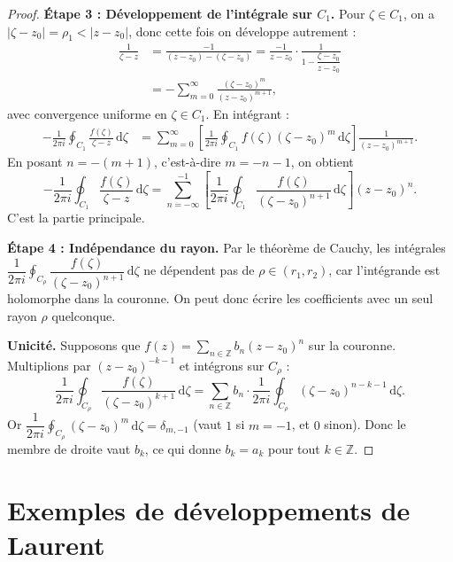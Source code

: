 \documentclass[12pt,a4paper,openany]{book}
\theoremstyle{definition}
\theoremstyle{plain}
\theoremstyle{remark}
\newcommand{\Z}{\mathbb{Z}}
\newcommand{\dd}{\mathrm{d}}
\newcommand{\abs}[1]{\left|#1\right|}
\begin{document}
\begin{proof}
\medskip
\noindent\textbf{Étape 3 : Développement de l'intégrale sur $C_1$.}
Pour $\zeta \in C_1$, on a $\abs{\zeta - z_0} = \rho_1 < \abs{z - z_0}$,
donc cette fois on développe autrement :
\begin{align*}
  \frac{1}{\zeta - z}
  &= \frac{-1}{(z - z_0) - (\zeta - z_0)}
  = \frac{-1}{z - z_0}\cdot\frac{1}{1 - \dfrac{\zeta - z_0}{z - z_0}} \\
  &= -\sum_{m=0}^{\infty}\frac{(\zeta - z_0)^m}{(z - z_0)^{m+1}},
\end{align*}
avec convergence uniforme en $\zeta \in C_1$. En intégrant :
\begin{align*}
  -\frac{1}{2\pi i}\oint_{C_1}\frac{f(\zeta)}{\zeta - z}\,\dd\zeta
  &= \sum_{m=0}^{\infty}\left[\frac{1}{2\pi i}\oint_{C_1}
  f(\zeta)(\zeta - z_0)^m\,\dd\zeta\right]\frac{1}{(z-z_0)^{m+1}}.
\end{align*}
En posant $n = -(m+1)$, c'est-à-dire $m = -n-1$, on obtient
\[
  -\frac{1}{2\pi i}\oint_{C_1}\frac{f(\zeta)}{\zeta - z}\,\dd\zeta
  = \sum_{n=-\infty}^{-1}\left[\frac{1}{2\pi i}\oint_{C_1}
  \frac{f(\zeta)}{(\zeta - z_0)^{n+1}}\,\dd\zeta\right](z-z_0)^n.
\]
C'est la partie principale.

\medskip
\noindent\textbf{Étape 4 : Indépendance du rayon.}
Par le théorème de Cauchy, les intégrales
$\dfrac{1}{2\pi i}\oint_{C_\rho}\dfrac{f(\zeta)}{(\zeta - z_0)^{n+1}}\,\dd\zeta$
ne dépendent pas de $\rho \in (r_1, r_2)$, car l'intégrande est
holomorphe dans la couronne. On peut donc écrire les coefficients
avec un seul rayon $\rho$ quelconque.

\medskip
\noindent\textbf{Unicité.}
Supposons que $f(z) = \sum_{n \in \Z} b_n(z - z_0)^n$ sur la couronne.
Multiplions par $(z - z_0)^{-k-1}$ et intégrons sur $C_\rho$ :
\[
  \frac{1}{2\pi i}\oint_{C_\rho}\frac{f(\zeta)}{(\zeta-z_0)^{k+1}}\,\dd\zeta
  = \sum_{n \in \Z} b_n \cdot \frac{1}{2\pi i}\oint_{C_\rho}
  (\zeta - z_0)^{n-k-1}\,\dd\zeta.
\]
Or $\dfrac{1}{2\pi i}\oint_{C_\rho}(\zeta - z_0)^{m}\,\dd\zeta
= \delta_{m,-1}$ (vaut $1$ si $m = -1$, et $0$ sinon). Donc le membre
de droite vaut $b_k$, ce qui donne $b_k = a_k$ pour tout $k \in \Z$.
\end{proof}

\section{Exemples de développements de Laurent}
\end{document}

